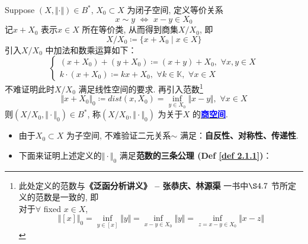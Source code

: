 	\begin{defn}\label{def 2.4.1}
		Suppose $(X , \Vert \cdot \Vert) \in B^*$, $X_0 \subset X$ 为闭子空间, 定义等价关系
		\[ x \sim y \,\, \Leftrightarrow \,\, x - y \in X_0 \]
		记$x + X_0$ 表示$x \in X$ 所在等价类, 从而得到商集$X / X_0$, 即
		\[ X / X_0 \coloneqq \{ x + X_0 \mid x \in X \} \]
		引入$X / X_0$ 中加法和数乘运算如下：
		\[ 
		 \begin{cases}
		 	(x + X_0) + (y + X_0) \coloneqq (x + y) + X_0 , \,\, \forall x , y \in X \\
		 	k \cdot (x + X_0) \coloneqq kx + X_0 , \,\, \forall k \in \mathbb{K} , \,\, \forall x \in X
		 \end{cases}
		 \]
		 不难证明此时$X / X_0$ 满足线性空间的要求. 再引入范数\footnote{此处定义的范数与\textbf{《泛函分析讲义》 -- 张恭庆、林源渠} 一书中$\S 4.7$ 节所定义的范数是一致的, 即\\
		 对于$\forall$ fixed $x \in X$, 
		 \[ \Big\Vert [x] \Big\Vert_0 = \inf_{y \in [x]} \Vert y \Vert = \inf_{x - y \in X_0} \Vert y \Vert = \inf_{z = x - y \in X_0} \Vert x - z \Vert \] }
		 \[ \Vert x + X_0 \Vert_0 \coloneqq dist(x , X_0) = \inf_{y \in X_0} \Vert x - y \Vert , \,\, \forall x \in X \]
		 则$(X / X_0 , \Vert \cdot \Vert_0) \in B^*$, 称$(X / X_0 , \Vert \cdot \Vert_0)$ 为关于$X$ 的\underline{\textcolor{blue}{\textbf{商空间}}}. 
		 
		 \vspace{4em}
		 
		 \begin{rmk}
		 	\begin{itemize}
		 		\item 由于$X_0 \subset X$ 为子空间, 不难验证二元关系$\sim$ 满足：\textbf{自反性、对称性、传递性}. 
		 		
		 		\vspace{4em}
		 		
		 		\item 下面来证明上述定义的$\Vert \cdot \Vert_0$ 满足\textbf{范数的三条公理 (Def \ref{def 2.1.1})}：
		 		
		 		\vspace{4em}
		 		

\end{itemize}
\end{rmk}
\end{defn}
